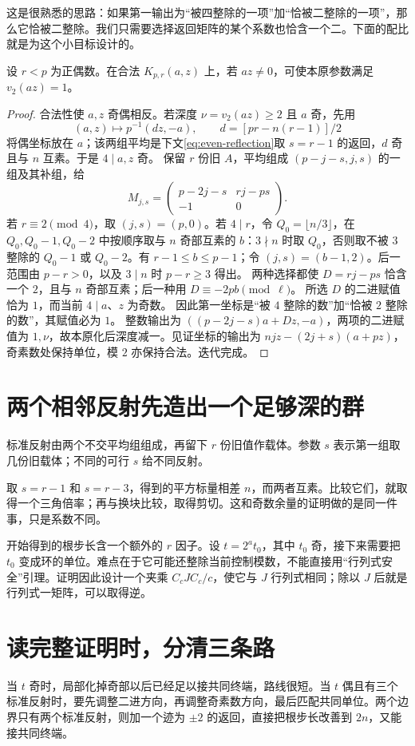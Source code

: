 这是很熟悉的思路：如果第一输出为“被四整除的一项”加“恰被二整除的一项”，那么它恰被二整除。我们只需要选择返回矩阵的某个系数也恰含一个二。下面的配比就是为这个小目标设计的。
\begin{lemma}[降低二进深度]\label{lem:binary-depth}
设 $r<p$ 为正偶数。在合法 $K_{p,r}(a,z)$ 上，若 $az\ne0$，可使本原参数满足 $v_2(az)=1$。
\end{lemma}
\begin{proof}
合法性使 $a,z$ 奇偶相反。若深度 $\nu=v_2(az)\ge2$ 且 $a$ 奇，先用
\[
(a,z)\mapsto p^{-1}(dz,-a),\qquad d=[pr-n(r-1)]/2
\]
将偶坐标放在 $a$；该两组平均是下文\eqref{eq:even-reflection}取 $s=r-1$ 的返回，$d$ 奇且与 $n$ 互素。于是 $4\mid a,z$ 奇。
保留 $r$ 份旧 $A$，平均组成 $(p-j-s,j,s)$ 的一组及其补组，给
\[
M_{j,s}=\begin{pmatrix}p-2j-s&rj-ps\\-1&0\end{pmatrix}.
\]
若 $r\equiv2\pmod4$，取 $(j,s)=(p,0)$。若 $4\mid r$，令 $Q_0=\lfloor n/3\rfloor$，在 $Q_0,Q_0-1,Q_0-2$ 中按顺序取与 $n$ 奇部互素的 $b$：$3\nmid n$ 时取 $Q_0$，否则取不被 $3$ 整除的 $Q_0-1$ 或 $Q_0-2$。有 $r-1\le b\le p-1$；令 $(j,s)=(b-1,2)$。后一范围由 $p-r>0$，以及 $3\mid n$ 时 $p-r\ge3$ 得出。
两种选择都使 $D=rj-ps$ 恰含一个 $2$，且与 $n$ 奇部互素；后一种用 $D\equiv-2pb\pmod\ell$。
所选 $D$ 的二进赋值恰为 $1$，而当前 $4\mid a$、$z$ 为奇数。
因此第一坐标是“被 $4$ 整除的数”加“恰被 $2$ 整除的数”，其赋值必为 $1$。
整数输出为 $((p-2j-s)a+Dz,-a)$，两项的二进赋值为 $1,\nu$，故本原化后深度减一。见证坐标的输出为 $njz-(2j+s)(a+pz)$，奇素数处保持单位，模 $2$ 亦保持合法。迭代完成。
\end{proof}

\section{两个相邻反射先造出一个足够深的群}
标准反射由两个不交平均组组成，再留下 $r$ 份旧值作载体。参数 $s$ 表示第一组取几份旧载体；不同的可行 $s$ 给不同反射。

取 $s=r-1$ 和 $s=r-3$，得到的平方标量相差 $n$，而两者互素。比较它们，就取得一个三角倍率；再与换块比较，取得剪切。这和奇数余量的证明做的是同一件事，只是系数不同。

开始得到的根步长含一个额外的 $r$ 因子。设 $t=2^a t_0$，其中 $t_0$ 奇，接下来需要把 $t_0$ 变成环的单位。难点在于它可能还整除当前控制模数，不能直接用“行列式安全”引理。证明因此设计一个夹乘 $C_cJC_c/c$，使它与 $J$ 行列式相同；除以 $J$ 后就是行列式一矩阵，可以取得逆。

\section{读完整证明时，分清三条路}
当 $t$ 奇时，局部化掉奇部以后已经足以接共同终端，路线很短。当 $t$ 偶且有三个标准反射时，要先调整二进方向，再调整奇素数方向，最后匹配共同单位。两个边界只有两个标准反射，则加一个迹为 $\pm2$ 的返回，直接把根步长改善到 $2n$，又能接共同终端。

